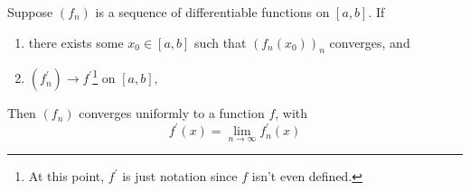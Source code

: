   \begin{theorem}
    Suppose $(f_n)$ is a sequence of differentiable functions on $[a, b]$. If 
    \begin{enumerate}
      \item there exists some $x_0 \in [a, b]$ such that $(f_n (x_0))_n$ converges, and 
      \item $(f_n^\prime) \to f^\prime$\footnote{At this point, $f^\prime$ is just notation since $f$ isn't even defined.} on $[a, b]$, 
    \end{enumerate}
    Then $(f_n)$ converges uniformly to a function $f$, with 
    \begin{equation}
      f^\prime (x) = \lim_{n \to \infty} f_n^\prime (x) 
    \end{equation}
  \end{theorem} 
